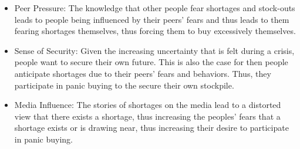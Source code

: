\begin{itemize}
    \item Peer Pressure: The knowledge that other people fear shortages and 
    stock-outs leads to people being influenced by their peers' fears and thus leads
    to them fearing shortages themselves, thus forcing them to buy excessively
    themselves.
    \item Sense of Security: Given the increasing uncertainty that is felt 
    during a crisis, people want to secure their own future. This is also
    the case for then people anticipate shortages due to their peers' fears 
    and behaviors. Thus, they participate in panic buying to the secure their
    own stockpile.
    \item Media Influence: The stories of shortages on the media
    lead to a distorted view that there exists a shortage, thus increasing 
    the peoples' fears that a shortage exists or is drawing near, thus increasing
    their desire to participate in panic buying.
\end{itemize}


